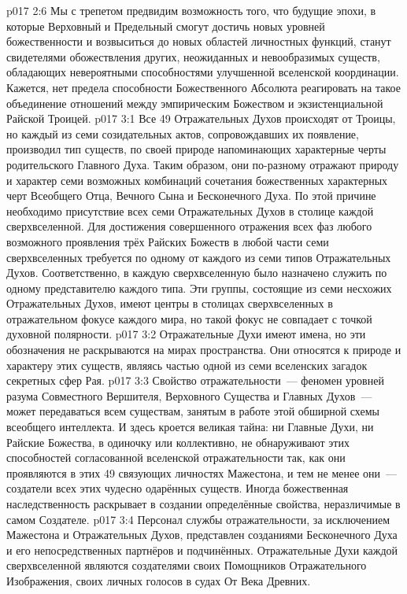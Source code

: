 \vs p017 2:6 Мы с трепетом предвидим возможность того, что будущие эпохи, в которые Верховный и Предельный смогут достичь новых уровней божественности и возвыситься до новых областей личностных функций, станут свидетелями обожествления других, неожиданных и невообразимых существ, обладающих невероятными способностями улучшенной вселенской координации. Кажется, нет предела способности Божественного Абсолюта реагировать на такое объединение отношений между эмпирическим Божеством и экзистенциальной Райской Троицей.
\vs p017 3:1 Все 49 Отражательных Духов происходят от Троицы, но каждый из семи созидательных актов, сопровождавших их появление, производил тип существ, по своей природе напоминающих характерные черты родительского Главного Духа. Таким образом, они по\hyp{}разному отражают природу и характер семи возможных комбинаций сочетания божественных характерных черт Всеобщего Отца, Вечного Сына и Бесконечного Духа. По этой причине необходимо присутствие всех семи Отражательных Духов в столице каждой сверхвселенной. Для достижения совершенного отражения всех фаз любого возможного проявления трёх Райских Божеств в любой части семи сверхвселенных требуется по одному от каждого из семи типов Отражательных Духов. Соответственно, в каждую сверхвселенную было назначено служить по одному представителю каждого типа. Эти группы, состоящие из семи несхожих Отражательных Духов, имеют центры в столицах сверхвселенных в отражательном фокусе каждого мира, но такой фокус не совпадает с точкой духовной полярности.
\vs p017 3:2 Отражательные Духи имеют имена, но эти обозначения не раскрываются на мирах пространства. Они относятся к природе и характеру этих существ, являясь частью одной из семи вселенских загадок секретных сфер Рая.
\vs p017 3:3 Свойство отражательности~--- феномен уровней разума Совместного Вершителя, Верховного Существа и Главных Духов~--- может передаваться всем существам, занятым в работе этой обширной схемы всеобщего интеллекта. И здесь кроется великая тайна: ни Главные Духи, ни Райские Божества, в одиночку или коллективно, не обнаруживают этих способностей согласованной вселенской отражательности так, как они проявляются в этих 49 связующих личностях Мажестона, и тем не менее они~--- создатели всех этих чудесно одарённых существ. Иногда божественная наследственность раскрывает в создании определённые свойства, неразличимые в самом Создателе.
\vs p017 3:4 Персонал службы отражательности, за исключением Мажестона и Отражательных Духов, представлен созданиями Бесконечного Духа и его непосредственных партнёров и подчинённых. Отражательные Духи каждой сверхвселенной являются создателями своих Помощников Отражательного Изображения, своих личных голосов в судах От Века Древних.
